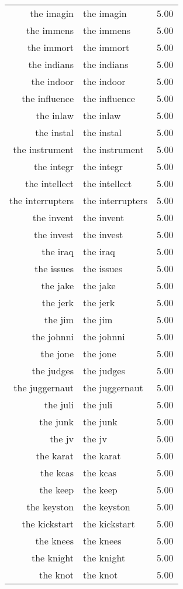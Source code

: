 \begin{table}[ht]
\begin{tabular}{rlr}
  the imagin & the imagin & 5.00 \\ 
  the immens & the immens & 5.00 \\ 
  the immort & the immort & 5.00 \\ 
  the indians & the indians & 5.00 \\ 
  the indoor & the indoor & 5.00 \\ 
  the influence & the influence & 5.00 \\ 
  the inlaw & the inlaw & 5.00 \\ 
  the instal & the instal & 5.00 \\ 
  the instrument & the instrument & 5.00 \\ 
  the integr & the integr & 5.00 \\ 
  the intellect & the intellect & 5.00 \\ 
  the interrupters & the interrupters & 5.00 \\ 
  the invent & the invent & 5.00 \\ 
  the invest & the invest & 5.00 \\ 
  the iraq & the iraq & 5.00 \\ 
  the issues & the issues & 5.00 \\ 
  the jake & the jake & 5.00 \\ 
  the jerk & the jerk & 5.00 \\ 
  the jim & the jim & 5.00 \\ 
  the johnni & the johnni & 5.00 \\ 
  the jone & the jone & 5.00 \\ 
  the judges & the judges & 5.00 \\ 
  the juggernaut & the juggernaut & 5.00 \\ 
  the juli & the juli & 5.00 \\ 
  the junk & the junk & 5.00 \\ 
  the jv & the jv & 5.00 \\ 
  the karat & the karat & 5.00 \\ 
  the kcas & the kcas & 5.00 \\ 
  the keep & the keep & 5.00 \\ 
  the keyston & the keyston & 5.00 \\ 
  the kickstart & the kickstart & 5.00 \\ 
  the knees & the knees & 5.00 \\ 
  the knight & the knight & 5.00 \\ 
  the knot & the knot & 5.00 \\ 

\end{tabular}
\end{table}
